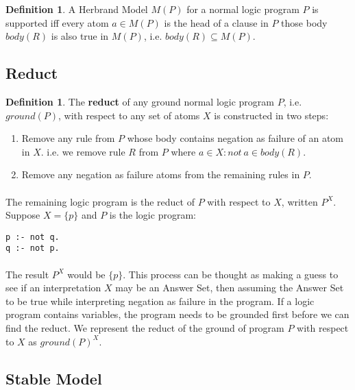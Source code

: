 \documentclass{article}
\theoremstyle{plain}
\theoremstyle{definition}
\newtheorem{defn}[thm]{Definition} %
\begin{document}
\begin{multicols}{2}
\begin{defn}A Herbrand Model $M(P)$ for a normal logic program $P$ is supported iff every atom $a \in M(P)$ is the head of a clause in $P$ those body $body(R)$ is also true in $M(P)$, i.e. $body(R) \subseteq M(P)$. \end{defn}

\subsection{Reduct}

\begin{defn}The \textbf{reduct} of any ground normal logic program $P$, i.e. $ground(P)$, with respect to any set of atoms $X$ is constructed in two steps:\end{defn}

\begin{enumerate}
\item Remove any rule from $P$ whose body contains negation as failure of an atom in $X$. i.e. we remove rule $R$ from $P$ where $a \in X: not\ a \in body(R)$.
\item Remove any negation as failure atoms from the remaining rules in $P$.
\end{enumerate}

\paragraph{} The remaining logic program is the reduct of $P$ with respect to $X$, written $P^X$. Suppose $X = \{p\}$ and $P$ is the logic program:

\begin{lstlisting}
p :- not q.
q :- not p.
\end{lstlisting}

\paragraph{} The result $P^X$ would be $\{p\}$. This process can be thought as making a guess to see if an interpretation $X$ may be an Answer Set, then assuming the Answer Set to be true while interpreting negation as failure in the program. If a logic program contains variables, the program needs to be grounded first before we can find the reduct. We represent the reduct of the ground of program $P$ with respect to $X$ as $ground(P)^X$.

\subsection{Stable Model}


\end{multicols}
\end{document}

